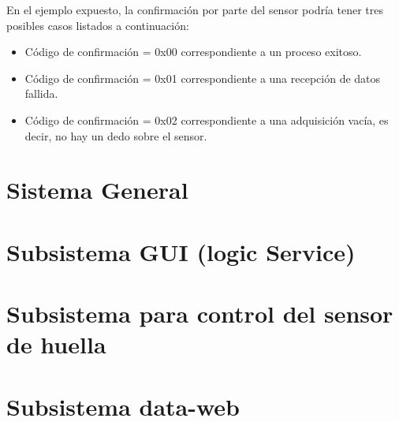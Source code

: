 En el ejemplo expuesto, la confirmación por parte del sensor podría tener tres posibles casos listados a continuación:

\begin{itemize}
\item Código de confirmación = 0x00 correspondiente a un proceso exitoso. 
\item Código de confirmación = 0x01 correspondiente a una recepción de datos fallida. 
\item Código de confirmación = 0x02 correspondiente a una adquisición vacía, es decir, no hay un dedo sobre el sensor.
\end{itemize}


\section{Sistema General}
\section{Subsistema GUI (logic Service)}
\section{Subsistema para control del sensor de huella}
\section{Subsistema data-web}
